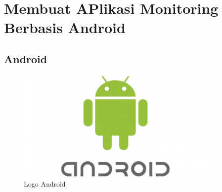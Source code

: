 \section{Membuat APlikasi Monitoring Berbasis Android}
\subsection{Android}
 \begin{figure}[H]
    \centering
    \includegraphics[width=0.9\textwidth]{figures/android.png}
    \caption{Logo Android}
    \label{print}
    \end{figure}
    
